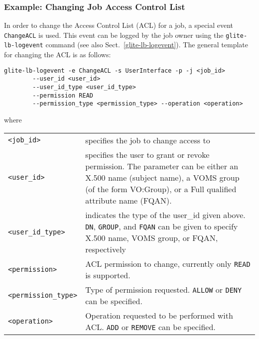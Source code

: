 %
%
\subsubsection{Example: Changing Job Access Control List}
\label{e:change-acl}

In order to change the Access Control List (ACL) for a job, a special event
\verb'ChangeACL' is used. This event can be logged by the job owner using the
\verb'glite-lb-logevent' command (see also Sect.~\ref{glite-lb-logevent}).
The general template for changing the ACL is as follows:

\begin{verbatim}
glite-lb-logevent -e ChangeACL -s UserInterface -p -j <job_id>
        --user_id <user_id>                                             
        --user_id_type <user_id_type>                                   
        --permission READ
        --permission_type <permission_type> --operation <operation>
\end{verbatim}

where

\begin{tabularx}{\textwidth}{>{\texttt}lX}
\verb'<job_id>'    & specifies the job to change access to\\
\verb'<user_id>'   & specifies the user to grant or revoke permission. The
               parameter can be either an X.500 name
               (subject name), a VOMS group (of the form VO:Group), or a Full
               qualified attribute name (FQAN). \\
\verb'<user_id_type>' & indicates the type of the user\_id given above.
               \verb'DN', \verb'GROUP', and \verb'FQAN' can be given to
               specify X.500 name, VOMS group, or FQAN, respectively \\
\verb'<permission>' & ACL permission to change, currently only \verb'READ' is
               supported. \\
\verb'<permission_type>' & Type of permission requested. \verb'ALLOW' or
               \verb'DENY' can be specified. \\
\verb'<operation>' & Operation requested to be performed with ACL. \verb'ADD'
               or \verb'REMOVE' can be specified. \\
\end{tabularx}

